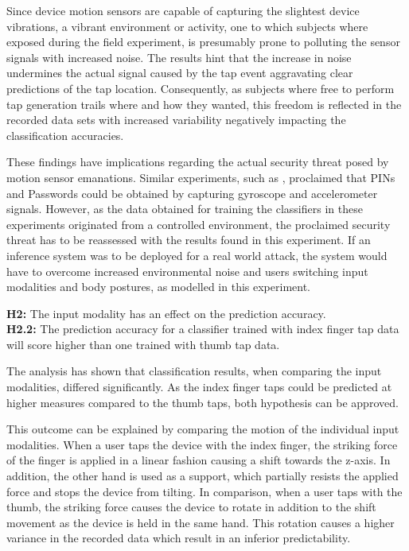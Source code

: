 Since device motion sensors are capable of capturing the slightest device vibrations, a vibrant environment or activity, one to which subjects where exposed during the field experiment, is presumably prone to polluting the sensor signals with increased noise. The results hint that the increase in noise undermines the actual signal caused by the tap event aggravating clear predictions of the tap location. Consequently, as subjects where free to perform tap generation trails where and how they wanted, this freedom is reflected in the recorded data sets with increased variability negatively impacting the classification accuracies.

These findings have implications regarding the actual security threat posed by motion sensor emanations. Similar experiments, such as \cite{Tapprints, Accessory}, proclaimed that PINs and Passwords could be obtained by capturing gyroscope and accelerometer signals. However, as the data obtained for training the classifiers in these experiments originated from a controlled environment, the proclaimed security threat has to be reassessed with the results found in this experiment. If an inference system was to be deployed for a real world attack, the system would have to overcome increased environmental noise and users switching input modalities and body postures, as modelled in this experiment. \\

\begin{center}
  \begin{framed}
    \textbf{H2:} The input modality has an effect on the prediction accuracy.\\
    \textbf{H2.2:} The prediction accuracy for a classifier trained with index finger tap data will score higher than one trained with thumb tap data.
  \end{framed}
\end{center}

The analysis has shown that classification results, when comparing the input modalities, differed significantly. As the index finger taps could be predicted at higher measures compared to the thumb taps, both hypothesis can be approved.

This outcome can be explained by comparing the motion of the individual input modalities. When a user taps the device with the index finger, the striking force of the finger is applied in a linear fashion causing a shift towards the z-axis. In addition, the other hand is used as a support, which partially resists the applied force and stops the device from tilting. In comparison, when a user taps with the thumb, the striking force causes the device to rotate in addition to the shift movement as the device is held in the same hand. This rotation causes a higher variance in the recorded data which result in an inferior predictability.


